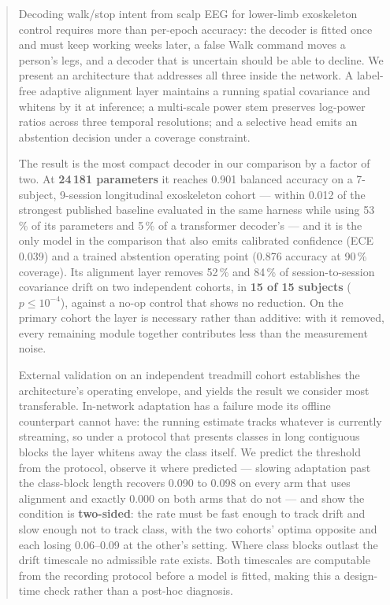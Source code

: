 \documentclass[conference]{IEEEtran}
\begin{document}
\begin{abstract}
Decoding walk/stop intent from scalp EEG for lower-limb exoskeleton control
requires more than per-epoch accuracy: the decoder is fitted once and must keep
working weeks later, a false Walk command moves a person's legs, and a decoder
that is uncertain should be able to decline. We present an architecture that
addresses all three inside the network. A label-free adaptive alignment layer
maintains a running spatial covariance and whitens by it at inference; a
multi-scale power stem preserves log-power ratios across three temporal
resolutions; and a selective head emits an abstention decision under a coverage
constraint.

The result is the most compact decoder in our comparison by a factor of two.
At \textbf{24\,181 parameters} it reaches 0.901 balanced accuracy on a
7-subject, 9-session longitudinal exoskeleton cohort --- within 0.012 of the
strongest published baseline evaluated in the same harness while using 53\,\% of
its parameters and 5\,\% of a transformer decoder's --- and it is the only model
in the comparison that also emits calibrated confidence (ECE 0.039) and a trained
abstention operating point (0.876 accuracy at 90\,\% coverage). Its alignment
layer removes 52\,\% and 84\,\% of session-to-session covariance drift on two
independent cohorts, in \textbf{15 of 15 subjects} ($p \le 10^{-4}$), against a
no-op control that shows no reduction. On the primary cohort the layer is
necessary rather than additive: with it removed, every remaining module together
contributes less than the measurement noise.

External validation on an independent treadmill cohort establishes the
architecture's operating envelope, and yields the result we consider most
transferable. In-network adaptation has a failure mode its offline counterpart
cannot have: the running estimate tracks whatever is currently streaming, so
under a protocol that presents classes in long contiguous blocks the layer
whitens away the class itself. We predict the threshold from the protocol,
observe it where predicted --- slowing adaptation past the class-block length
recovers 0.090 to 0.098 on every arm that uses alignment and exactly 0.000 on
both arms that do not --- and show the condition is \textbf{two-sided}: the rate
must be fast enough to track drift and slow enough not to track class, with the
two cohorts' optima opposite and each losing 0.06--0.09 at the other's setting.
Where class blocks outlast the drift timescale no admissible rate exists. Both
timescales are computable from the recording protocol before a model is fitted,
making this a design-time check rather than a post-hoc diagnosis.
\end{abstract}
\end{document}
